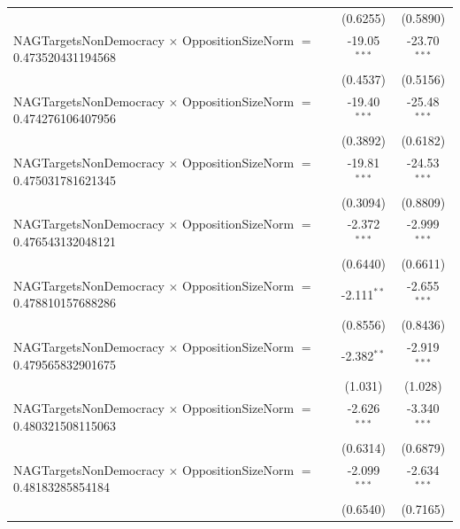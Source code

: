 \begin{tabular}{lcc}
                                                                                & (0.6255)             & (0.5890)\\   
   NAGTargetsNonDemocracy $\times$ OppositionSizeNorm $=$ 0.473520431194568     & -19.05$^{***}$       & -23.70$^{***}$\\   
                                                                                & (0.4537)             & (0.5156)\\   
   NAGTargetsNonDemocracy $\times$ OppositionSizeNorm $=$ 0.474276106407956     & -19.40$^{***}$       & -25.48$^{***}$\\   
                                                                                & (0.3892)             & (0.6182)\\   
   NAGTargetsNonDemocracy $\times$ OppositionSizeNorm $=$ 0.475031781621345     & -19.81$^{***}$       & -24.53$^{***}$\\   
                                                                                & (0.3094)             & (0.8809)\\   
   NAGTargetsNonDemocracy $\times$ OppositionSizeNorm $=$ 0.476543132048121     & -2.372$^{***}$       & -2.999$^{***}$\\   
                                                                                & (0.6440)             & (0.6611)\\   
   NAGTargetsNonDemocracy $\times$ OppositionSizeNorm $=$ 0.478810157688286     & -2.111$^{**}$        & -2.655$^{***}$\\   
                                                                                & (0.8556)             & (0.8436)\\   
   NAGTargetsNonDemocracy $\times$ OppositionSizeNorm $=$ 0.479565832901675     & -2.382$^{**}$        & -2.919$^{***}$\\   
                                                                                & (1.031)              & (1.028)\\   
   NAGTargetsNonDemocracy $\times$ OppositionSizeNorm $=$ 0.480321508115063     & -2.626$^{***}$       & -3.340$^{***}$\\   
                                                                                & (0.6314)             & (0.6879)\\   
   NAGTargetsNonDemocracy $\times$ OppositionSizeNorm $=$ 0.48183285854184      & -2.099$^{***}$       & -2.634$^{***}$\\   
                                                                                & (0.6540)             & (0.7165)\\   

\end{tabular}
